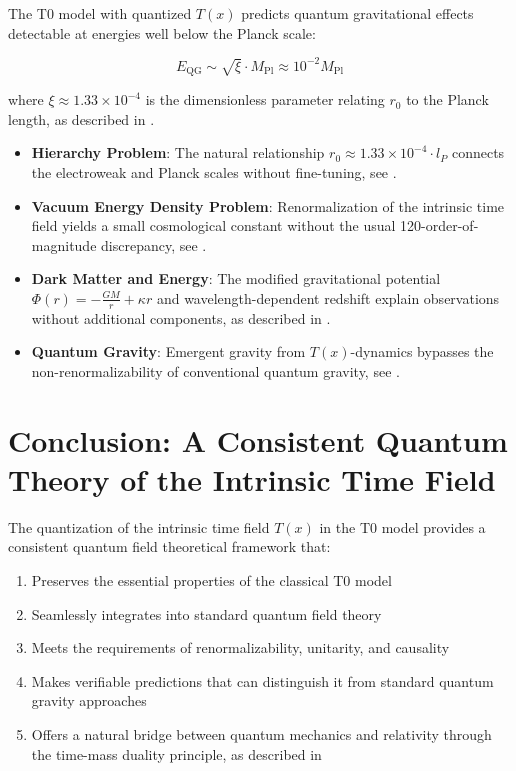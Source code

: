 \documentclass[12pt,a4paper]{article}
\newcommand{\Tfield}{T(x)}
\newcommand{\Mpl}{M_{\text{Pl}}}
\begin{document}
	The T0 model with quantized $\Tfield$ predicts quantum gravitational effects detectable at energies well below the Planck scale:
	
	\begin{equation}
		E_{\text{QG}} \sim \sqrt{\xi} \cdot \Mpl \approx 10^{-2} \Mpl
	\end{equation}
	
	where $\xi \approx 1.33 \times 10^{-4}$ is the dimensionless parameter relating $r_0$ to the Planck length, as described in \cite{pascher_planck_2025_en}.
	
	\begin{tcolorbox}[colback=blue!5!white,colframe=blue!75!black,title=Solutions to Fundamental Problems in the T0 Model]
		\begin{itemize}
			\item \textbf{Hierarchy Problem}: The natural relationship $r_0 \approx 1.33 \times 10^{-4} \cdot l_P$ connects the electroweak and Planck scales without fine-tuning, see \cite{pascher_params_2025_en}.
			\item \textbf{Vacuum Energy Density Problem}: Renormalization of the intrinsic time field yields a small cosmological constant without the usual 120-order-of-magnitude discrepancy, see \cite{pascher_temp_2025_en}.
			\item \textbf{Dark Matter and Energy}: The modified gravitational potential $\Phi(r) = -\frac{GM}{r} + \kappa r$ and wavelength-dependent redshift explain observations without additional components, as described in \cite{pascher_energiedynamik_2025_en}.
			\item \textbf{Quantum Gravity}: Emergent gravity from $\Tfield$-dynamics bypasses the non-renormalizability of conventional quantum gravity, see \cite{pascher_planck_2025_en}.
		\end{itemize}
	\end{tcolorbox}
	
	\section{Conclusion: A Consistent Quantum Theory of the Intrinsic Time Field}
	\label{sec:schlussfolgerung}
	
	The quantization of the intrinsic time field $\Tfield$ in the T0 model provides a consistent quantum field theoretical framework that:
	
	\begin{enumerate}
		\item Preserves the essential properties of the classical T0 model
		\item Seamlessly integrates into standard quantum field theory
		\item Meets the requirements of renormalizability, unitarity, and causality
		\item Makes verifiable predictions that can distinguish it from standard quantum gravity approaches
		\item Offers a natural bridge between quantum mechanics and relativity through the time-mass duality principle, as described in \cite{pascher_vereinheitlichung_2025_en}
	\end{enumerate}
	
\end{document}
